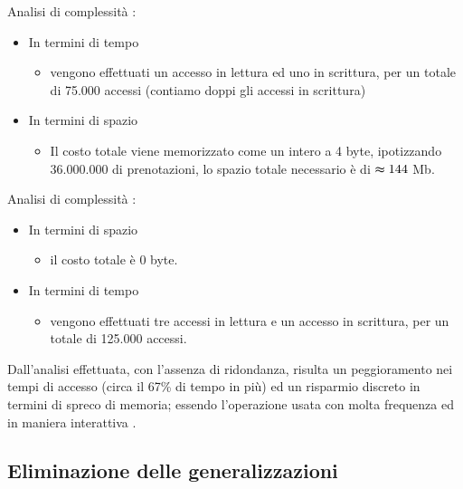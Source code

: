 % 
% 
% 
%

Analisi di complessità :
\begin{itemize}
      \item In termini di tempo
      \begin{itemize}
            \item vengono effettuati un accesso in lettura ed uno in scrittura, per un totale di 75.000 accessi (contiamo doppi gli accessi in scrittura)
      \end{itemize}
      \item In termini di spazio
      \begin{itemize}
            \item Il costo totale viene memorizzato come un intero a 4 byte, ipotizzando 36.000.000 di prenotazioni, lo spazio totale necessario è di $\thickapprox 144$ Mb.
      \end{itemize}
\end{itemize}

Analisi di complessità :
\begin{itemize}
      \item In termini di spazio
      \begin{itemize}
            \item il costo totale è 0 byte.
      \end{itemize}
      \item In termini di tempo
      \begin{itemize}
            \item vengono effettuati tre accessi in lettura e un accesso in scrittura, per un totale di 125.000 accessi.
      \end{itemize}
\end{itemize}
Dall'analisi effettuata, con l'assenza di ridondanza, risulta un peggioramento nei tempi di accesso (circa il 67\% di tempo in più) ed un risparmio discreto in termini di spreco di memoria; essendo l'operazione usata con molta frequenza ed in maniera interattiva .

\subsection{Eliminazione delle generalizzazioni}
